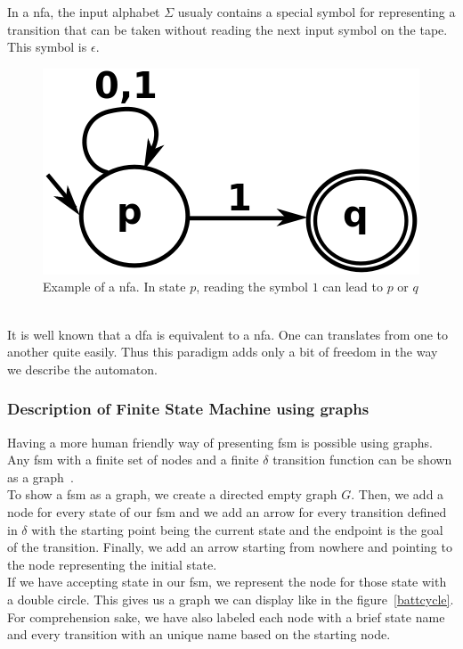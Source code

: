 \documentclass[12pt]{article}
\begin{document}
In a \gls{nfa}, the input alphabet $\Sigma$ usualy contains a special symbol for representing a transition that can be taken without reading the next input symbol on the tape. This symbol is $\epsilon$.\\

\begin{figure}
    \centering
    \includegraphics[scale=0.4]{graph/nfa.png}
    \caption{Example of a \gls{nfa}. In state $p$, reading the symbol $1$ can lead to $p$ or $q$~\cite{NFA:2017}}
    \label{nfa}
\end{figure}

It is well known that a \gls{dfa} is equivalent to a \gls{nfa}. One can translates from one to another quite easily. Thus this paradigm adds only a bit of freedom in the way we describe the automaton.\\

\subsubsection{Description of Finite State Machine using graphs}

Having a more human friendly way of presenting \gls{fsm} is possible using graphs. Any \gls{fsm} with a finite set of nodes and a finite $\delta$ transition function can be shown as a graph~\cite{Keller-FSM}.\\

To show a \gls{fsm} as a graph, we create a directed empty graph $G$. Then, we add a node for every state of our \gls{fsm} and we add an arrow for every transition defined in $\delta$ with the starting point being the current state and the endpoint is the goal of the transition. Finally, we add an arrow starting from nowhere and pointing to the node representing the initial state.\\

If we have accepting state in our \gls{fsm}, we represent the node for those state with a double circle. This gives us a graph we can display like in the figure~\ref{battcycle}. For comprehension sake, we have also labeled each node with a brief state name and every transition with an unique name based on the starting node.
\end{document}
